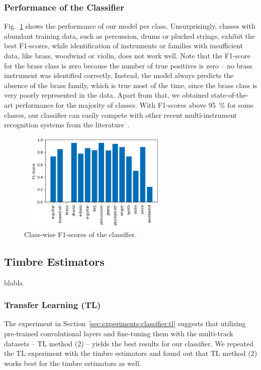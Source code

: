 \documentclass{article}
\begin{document}
\subsubsection{Performance of the Classifier}
\label{sec:experiments:classifier:performance}
Fig.~\ref{fig:f1-scores} shows the performance of our model per class. Unsurprisingly, classes with abundant training data, such as percussion, drums or plucked strings, exhibit the best F1-scores, while identification of instruments or families with insufficient data, like brass, woodwind or violin, does not work well. Note that the F1-score for the brass class is zero because the number of true positives is zero -- no brass instrument was identified correctly. Instead, the model always predicts the absence of the brass family, which is true most of the time, since the brass class is very poorly represented in the data. Apart from that, we obtained state-of-the-art performance for the majority of classes. With F1-scores above \SI{95}{\percent} for some classes, our classifier can easily compete with other recent multi-instrument recognition systems from the literature~\cite{gururani2019attention, seipel2018music, kadandale2018musical}.
\begin{figure}[t]
	\begin{minipage}[b]{1.0\linewidth}
		\centering
		\centerline{\includegraphics[width=7.5cm,height=4.75cm]{f1-scores.png}}
	\end{minipage}
	\centering
	\caption{Class-wise F1-scores of the classifier.}
	\label{fig:f1-scores}
	\vspace*{-0.05cm}	
\end{figure}

\subsection{Timbre Estimators}
\label{sec:experiments:te}
blabla

\subsubsection{Transfer Learning (TL)}
\label{sec:experiments:te:tl}
The experiment in Section~\ref{sec:experiments:classifier:tl} suggests that utilizing pre-trained convolutional layers and fine-tuning them with the multi-track datasets -- TL method (2) -- yields the best results for our classifier. We repeated the TL experiment with the timbre estimators and found out that TL method (2) works best for the timbre estimators as well.
\end{document}

